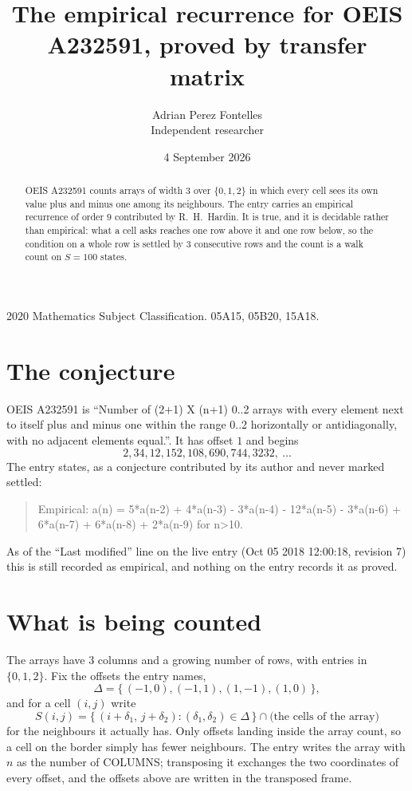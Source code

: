 \documentclass[11pt,a4paper]{article}
\title{The empirical recurrence for OEIS A232591, proved by transfer matrix}
\author{Adrian Perez Fontelles\\ \small Independent researcher}
\date{4 September 2026}
\theoremstyle{plain}
\theoremstyle{definition}
\begin{document}
\maketitle

\begin{abstract}
OEIS A232591 counts arrays of width $3$ over $\{0,1,2\}$ in which every cell sees its own value plus and minus one among its neighbours. The entry carries an
empirical recurrence of order $9$ contributed by R.~H.~Hardin. It is true, and it is
decidable rather than empirical: what a cell asks reaches one row above it and one row below, so the
condition on a whole row is settled by $3$ consecutive rows and the count is a walk
count on $S=100$ states.
\end{abstract}

\noindent\small 2020 Mathematics Subject Classification. 05A15, 05B20, 15A18.\normalsize

\section{The conjecture}

OEIS A232591 is ``Number of (2+1) X (n+1) 0..2 arrays with every element next to itself plus and minus one within the range 0..2 horizontally or antidiagonally, with no adjacent elements equal.''. It has offset $1$ and begins
\[
2, 34, 12, 152, 108, 690, 744, 3232,\ \dots
\]
The entry states, as a conjecture contributed by its author and never marked settled:
\begin{quote}
Empirical: a(n) = 5*a(n-2) + 4*a(n-3) - 3*a(n-4) - 12*a(n-5) - 3*a(n-6) + 6*a(n-7) + 6*a(n-8) + 2*a(n-9) for n>10.
\end{quote}
As of the ``Last modified'' line on the live entry (Oct 05 2018 12:00:18, revision 7) this is still
recorded as empirical, and nothing on the entry records it as proved.

\section{What is being counted}

The arrays have $3$ columns and a growing number of rows, with entries in $\{0,1,2\}$. Fix the
offsets the entry names,
\[
\Delta=\{\,(-1,0), (-1,1), (1,-1), (1,0)\,\},
\]
and for a cell $(i,j)$ write
\[
S(i,j)=\{\,(i+\delta_1,\,j+\delta_2) : (\delta_1,\delta_2)\in\Delta\,\}\cap
\text{(the cells of the array)}
\]
for the neighbours it actually has. Only offsets landing inside the array count, so a cell on
the border simply has fewer neighbours. The entry writes the array with $n$ as the number of COLUMNS; transposing it exchanges the two coordinates of every offset, and the offsets above are written in the transposed frame.
\end{document}
